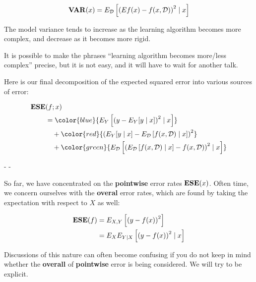 %
%
\begin{frame}
  \begin{align*}
    \operatorname*{\mathbf{VAR}}(x) = E_{\operatorname*{\mathcal{D}}} \left[ \left( Ef(x) - f(x,\operatorname*{\mathcal{D}}) \right)^2 \mid x \right]
  \end{align*}

  The model variance tends to increase as the learning algorithm becomes more
  complex, and decrease as it becomes more rigid.
\end{frame}
%
%
\begin{frame}
  It is possible to make the phrases ``learning algorithm becomes more/less complex''
  precise, but it is not easy, and it will have to wait for another talk.
\end{frame}
%
%
\begin{frame}
  Here is our final decomposition of the expected squared error into various
  sources of error:

  \begin{align*}
    \ESE & (f; x) \\
    &= \color{blue}{ 
         E_Y \left[ \left( y - E_Y[y \mid x] \right)^2 \mid x \right] } \\
       & \quad + \color{red}{
         \left( E_Y[y \mid x] -  E_{\D} \left[ f(x, \D) \mid x \right] \right)^2
       } \\
       & \quad + \color{green}{
         E_{\D} \left[ \left( E_{\D} \left[ f(x, \D) \mid x \right] - 
         f(x,\D) \right)^2 \mid x \right]
       }
  \end{align*}
  \begin{center}
    \color{blue}{Irreducible Error} - \color{red}{Model Bias} - \color{green}{Model
    Variance}
  \end{center}
\end{frame}
%
%
\begin{frame}
  So far, we have concentrated on the \textbf{pointwise} error rates $\operatorname*{\mathbf{ESE}}(x)$.
  Often time, we concern ourselves with the \textbf{overal} error rates, which
  are found by taking the expectation with respect to $X$ as well:

  \begin{align*}
    \operatorname*{\mathbf{ESE}}(f) & = E_{X,Y} \left[ \left( y - f(x) \right)^2 \right] \\
    &= E_X E_{Y \mid X} \left[ \left( y - f(x) \right)^2 \mid x \right]
  \end{align*}

  Discussions of this nature can often become confusing if you do not keep in
  mind whether the \textbf{overall} of \textbf{pointwise} error is being
  considered.  We will try to be explicit.
\end{frame}
